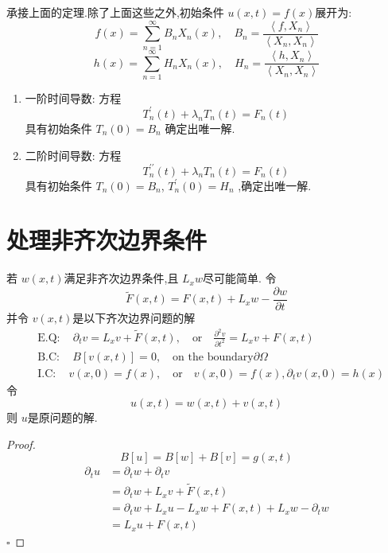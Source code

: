 \documentclass[../../main.tex]{subfiles}
\begin{document}
\begin{theorem}
    承接上面的定理.除了上面这些之外,初始条件 \(  u\left( x,t \right)= f\left( x \right)    \)展开为: \[
    f\left( x \right)= \sum _{n = 1}^{\infty}B_{n}X_{n}\left( x \right)  ,\quad B_{n}= \frac{\left<f,X_{n} \right> }{\left<X_{n},X_{n} \right> } 
    \]  \[
    h\left( x \right)= \sum _{n = 1}^{\infty}H_{n}X_{n}\left( x \right),\quad H_{n}= \frac{\left<h,X_{n} \right> }{\left<X_{n},X_{n} \right> }   
    \]
    \begin{enumerate}
        \item 一阶时间导数: 方程 \[
        T_{n}^{\prime} \left( t \right)+ \lambda _{n}T_{n}\left( t \right)= F_{n}\left( t \right)   
        \]具有初始条件 \(  T_{n}\left( 0 \right)= B_{n}   \) 确定出唯一解.
        \item 二阶时间导数: 方程 \[
        T_{n}^{\prime \prime} \left( t \right)+ \lambda _{n}T_{n}\left( t \right)= F_{n}\left( t \right)   
        \]具有初始条件 \(  T_{n}\left( 0 \right)= B_{n}   \), \(  T^{\prime} _{n}\left( 0 \right)= H_{n}   \)  ,确定出唯一解.
    \end{enumerate}
    
\end{theorem}

\section{处理非齐次边界条件}

\begin{theorem}
    若 \(  w\left( x,t \right)   \)满足非齐次边界条件,且 \(  L_{x}w  \)尽可能简单. 令 \[
    \tilde{F}\left( x,t \right)= F\left( x,t \right)+ L_{x}w-\frac{\partial w}{\partial t}  
    \]并令 \(  v\left( x,t \right)   \)是以下齐次边界问题的解  \[
\begin{aligned}
 &\mathrm{E}.\mathrm{Q}:\quad \partial _{t}v= L_{x}v+ \tilde{F}\left( x,t \right) ,\quad \text{or}\quad \frac{\partial ^{2}v}{\partial t^{2}}= L_{x}v+ F\left( x,t \right)   \\ 
  & \mathrm{B}.\mathrm{C}: \quad B[v\left( x,t \right) ]= 0,\quad \text{on the boundary} \partial  \Omega \\ 
   & \mathrm{I}.\mathrm{C}:\quad  v\left( x,0 \right)= f\left( x \right)   , \quad \text{or} \quad  v\left( x,0 \right)= f\left( x \right),  \partial _{t}v\left( x,0 \right)= h\left( x \right)    
\end{aligned}
\]令 \[
u\left( x,t \right)= w\left( x,t \right)+ v\left( x,t \right)   
\]则 \(  u  \)是原问题的解. 
\end{theorem}
\begin{proof}
    \[
    B[u]= B[w]+ B[v]= g\left( x,t \right) 
    \]
     \[
   \begin{aligned}
      \partial _{t}u&=  \partial _{t}w+  \partial _{t}v\\ 
       &=  \partial _{t}w+ L_{x}v+ \tilde{F}\left( x,t \right)\\ 
        &=  \partial _{t}w+ L_{x}u-L_{x}w + F\left( x,t \right)+ L_{x}w- \partial _{t}w\\ 
         &= L_{x}u+ F\left( x,t \right)  
   \end{aligned}
     \]
    \hfill $\square$
\end{proof}
\end{document}

